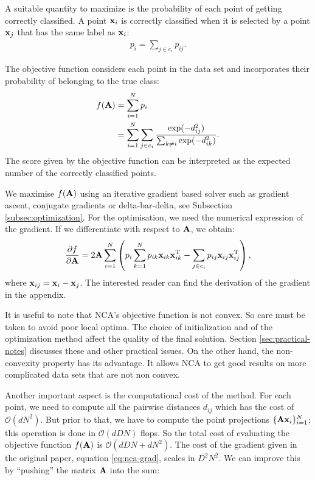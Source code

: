 	A suitable quantity to maximize is the probability of each point of getting correctly classified. A point $\mathbf{x}_i$ is correctly classified when it is selected by a point $\mathbf{x}_j$ that has the same label as $\mathbf{x}_i$:
	\begin{align}
		p_i = \sum_{j\in c_i} p_{ij}.
	\end{align}
	
	The objective function considers each point in the data set and incorporates their probability of belonging to the true class:
	\begin{align}
		f(\mathbf{A}) &= \sum_{i=1}^N p_i\notag\\
			   &= \sum_{i=1}^N \sum_{j\in c_i} \frac{
								\exp(-d_{ij}^2)
							  }{
								\sum_{k\neq i}\exp(-d_{ik}^2)
							  }.
	\label{eq:nca-obj}
	\end{align}
	The score given by the objective function can be interpreted as the expected number of the correctly classified points.
	
	We maximise $f(\mathbf{A})$ using an iterative gradient based solver such as gradient ascent, conjugate gradients or delta-bar-delta, see Subsection \ref{subsec:optimization}. For the optimisation, we need the numerical expression of the gradient. If we differentiate with respect to $\mathbf{A}$, we obtain:
	\begin{align}
	  \frac{\partial f}{\partial
	\mathbf{A}}=2\mathbf{A}\sum_{i=1}^{N}\left(p_i\sum_{k=1}^Np_{ik}\mathbf{x}_{ik}\mathbf{x}_{ik}^{\textrm{T}} -
	\sum_{j\in c_i}p_{ij}\mathbf{x}_{ij}\mathbf{x}_{ij}^{\textrm{T}} \right)\label{eq:nca-grad},
	\end{align}
	where $\mathbf{x}_{ij} = \mathbf{x}_i - \mathbf{x}_j$. The interested reader can find the derivation of the gradient in the appendix. 
	
	It is useful to note that NCA's objective function is not convex. So care must be taken to avoid poor local optima. The choice of initialization and of the optimization method affect the quality of the final solution. Section \ref{sec:practical-notes} discusses these and other practical issues. On the other hand, the non-convexity property has its advantage. It allows NCA to get good results on more complicated data sets that are not non convex. 

	Another important aspect is the computational cost of the method. For each point, we need to compute all the pairwise distances $d_{ij}$ which has the cost of $\mathcal{O}(dN^2)$. But prior to that, we have to compute the point projections $\{\mathbf{A}\mathbf{x}_i\}_{i=1}^N$; this operation is done in $\mathcal{O}(dDN)$ flops. So the total cost of evaluating the objective function $f(\mathbf{A})$ is  $\mathcal{O}(dDN+dN^2)$. The cost of the gradient given in the original paper, equation \ref{eq:nca-grad}, scales in $D^2N^2$. We can improve this by ``pushing'' the matrix $\mathbf{A}$ into the sum:

